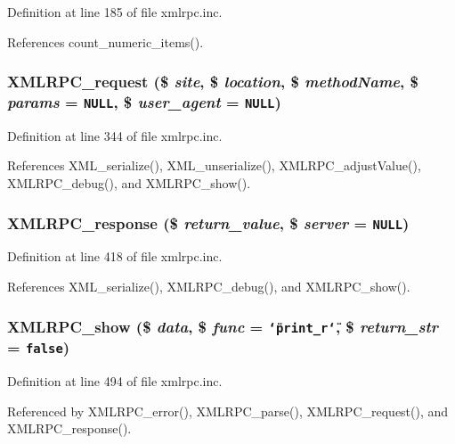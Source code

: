 Definition at line 185 of file xmlrpc.inc.

References count\_\-numeric\_\-items().\hypertarget{xmlrpc_8inc_3a98b6984b8ca01752d1aa9a267526a3}{
\subsubsection{\setlength{\rightskip}{0pt plus 5cm}XMLRPC\_\-request (\$ {\em site}, \$ {\em location}, \$ {\em methodName}, \$ {\em params} = {\tt NULL}, \$ {\em user\_\-agent} = {\tt NULL})}}
\label{xmlrpc_8inc_3a98b6984b8ca01752d1aa9a267526a3}




Definition at line 344 of file xmlrpc.inc.

References XML\_\-serialize(), XML\_\-unserialize(), XMLRPC\_\-adjustValue(), XMLRPC\_\-debug(), and XMLRPC\_\-show().\hypertarget{xmlrpc_8inc_c736d378caaccdd0726ea1080d1f526f}{
\subsubsection{\setlength{\rightskip}{0pt plus 5cm}XMLRPC\_\-response (\$ {\em return\_\-value}, \$ {\em server} = {\tt NULL})}}
\label{xmlrpc_8inc_c736d378caaccdd0726ea1080d1f526f}




Definition at line 418 of file xmlrpc.inc.

References XML\_\-serialize(), XMLRPC\_\-debug(), and XMLRPC\_\-show().\hypertarget{xmlrpc_8inc_1f60d2672bcb35f5ff908f64931f8d48}{
\subsubsection{\setlength{\rightskip}{0pt plus 5cm}XMLRPC\_\-show (\$ {\em data}, \$ {\em func} = {\tt \char`\"{}print\_\-r\char`\"{}}, \$ {\em return\_\-str} = {\tt false})}}
\label{xmlrpc_8inc_1f60d2672bcb35f5ff908f64931f8d48}




Definition at line 494 of file xmlrpc.inc.

Referenced by XMLRPC\_\-error(), XMLRPC\_\-parse(), XMLRPC\_\-request(), and XMLRPC\_\-response().